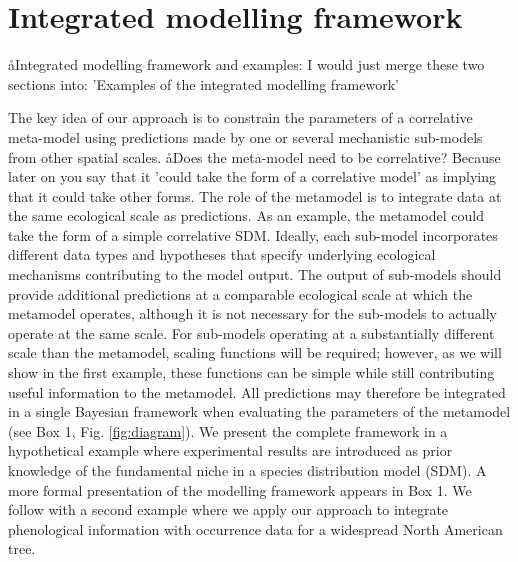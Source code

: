 
\section*{Integrated modelling framework}
\aa{Integrated modelling framework and examples: I would just merge these two sections into: 'Examples of the integrated modelling framework'}

The key idea of our approach is to constrain the parameters of a correlative meta-model using predictions made by one or several mechanistic sub-models from other spatial scales.
\aa{Does the meta-model need to be correlative? Because later on you say that it 'could take the form of a correlative model' as implying that it could take other forms.}
The role of the metamodel is to integrate data at the same ecological scale as predictions. 
As an example, the metamodel could take the form of a simple correlative \ac{SDM}.
Ideally, each sub-model incorporates different data types and hypotheses that specify underlying ecological mechanisms contributing to the model output.
The output of sub-models should provide additional predictions at a comparable ecological scale at which the metamodel operates, although it is not necessary for the sub-models to actually operate at the same scale.
For sub-models operating at a substantially different scale than the metamodel, scaling functions will be required; however, as we will show in the first example, these functions can be simple while still contributing useful information to the metamodel. 
All predictions may therefore be integrated in a single Bayesian framework when evaluating the parameters of the metamodel (see Box 1, Fig. \ref{fig:diagram}).
We present the complete framework in a hypothetical example where experimental results are  introduced as prior knowledge of the fundamental niche in a species distribution model (SDM).
A more formal presentation of the modelling framework appears in Box 1.
We follow with a second example where we apply our approach to integrate phenological information with occurrence data for a widespread North American tree.


